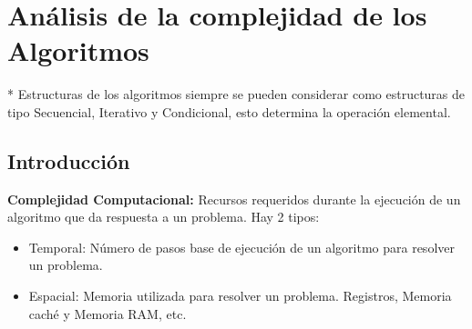 \chapter{Análisis de la complejidad de los Algoritmos}\label{ch:análisis-de-la-complejidad-de-los-algoritmos}

* Estructuras de los algoritmos siempre se pueden considerar como estructuras de tipo Secuencial, Iterativo y Condicional, esto determina la operación elemental.

\section{Introducción}\label{sec:introduccion}
\textbf{Complejidad Computacional:} Recursos requeridos durante la ejecución de un algoritmo que da respuesta a un problema. Hay 2 tipos:
\begin{itemize}
	\item Temporal: Número de pasos base de ejecución de un algoritmo para resolver un problema.
	\item Espacial: Memoria utilizada para resolver un problema. Registros, Memoria caché y Memoria RAM, etc.
\end{itemize}

